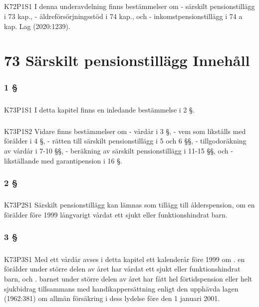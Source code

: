 \documentclass[a4paper,notitlepage,openany,10pt]{book}
\begin{document}
\paragraph*{}
{\tiny K72P1S1}
I denna underavdelning finns bestämmelser om
\newline - särskilt pensionstillägg i 73 kap.,
\newline - äldreförsörjningsstöd i 74 kap., och
\newline - inkomstpensionstillägg i 74 a kap.
Lag (2020:1239).
\chapter*{73 Särskilt pensionstillägg Innehåll}
\subsection*{1 §}
\paragraph*{}
{\tiny K73P1S1}
I detta kapitel finns en inledande bestämmelse i 2 §.
\paragraph*{}
{\tiny K73P1S2}
Vidare finns bestämmelser om
\newline - vårdår i 3 §,
\newline - vem som likställs med förälder i 4 §,
\newline - rätten till särskilt pensionstillägg i 5 och 6 §§,
\newline - tillgodoräkning av vårdår i 7-10 §§,
\newline - beräkning av särskilt pensionstillägg i 11-15 §§, och
\newline - likställande med garantipension i 16 §.
\subsection*{2 §}
\paragraph*{}
{\tiny K73P2S1}
Särskilt pensionstillägg kan lämnas som tillägg till ålderspension, om en förälder före 1999 långvarigt vårdat ett sjukt eller funktionshindrat barn.
\subsection*{3 §}
\paragraph*{}
{\tiny K73P3S1}
Med ett vårdår avses i detta kapitel ett kalenderår före 1999 om
. en förälder under större delen av året har vårdat ett sjukt eller funktionshindrat barn, och
. barnet under större delen av året har fått hel förtidspension eller helt sjukbidrag tillsammans med handikappersättning enligt den upphävda lagen (1962:381) om allmän försäkring i dess lydelse före den 1 januari 2001.
\end{document}
